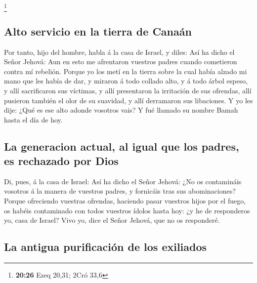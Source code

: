 \footnote{\textbf{20:26} Ezeq 20,31; 2Cró 33,6}

\hypertarget{alto-servicio-en-la-tierra-de-canauxe1n}{%
\subsection{Alto servicio en la tierra de
Canaán}\label{alto-servicio-en-la-tierra-de-canauxe1n}}

 Por tanto, hijo del hombre, habla á la casa de Israel, y
diles: Así ha dicho el Señor Jehová: Aun en esto me afrentaron vuestros
padres cuando cometieron contra mí rebelión.  Porque yo los
metí en la tierra sobre la cual había alzado mi mano que les había de
dar, y miraron á todo collado alto, y á todo árbol espeso, y allí
sacrificaron sus víctimas, y allí presentaron la irritación de sus
ofrendas, allí pusieron también el olor de su suavidad, y allí
derramaron sus libaciones.  Y yo les dije: ¿Qué es ese alto
adonde vosotros vais? Y fué llamado su nombre Bamah hasta el día de hoy.

\hypertarget{la-generacion-actual-al-igual-que-los-padres-es-rechazado-por-dios}{%
\subsection{La generacion actual, al igual que los padres, es rechazado
por
Dios}\label{la-generacion-actual-al-igual-que-los-padres-es-rechazado-por-dios}}

 Di, pues, á la casa de Israel: Así ha dicho el Señor
Jehová: ¿No os contamináis vosotros á la manera de vuestros padres, y
fornicáis tras sus abominaciones?  Porque ofreciendo
vuestras ofrendas, haciendo pasar vuestros hijos por el fuego, os habéis
contaminado con todos vuestros ídolos hasta hoy: ¿y he de responderos
yo, casa de Israel? Vivo yo, dice el Señor Jehová, que no os responderé.

\hypertarget{la-antigua-purificaciuxf3n-de-los-exiliados}{%
\subsection{La antigua purificación de los
exiliados}\label{la-antigua-purificaciuxf3n-de-los-exiliados}}

